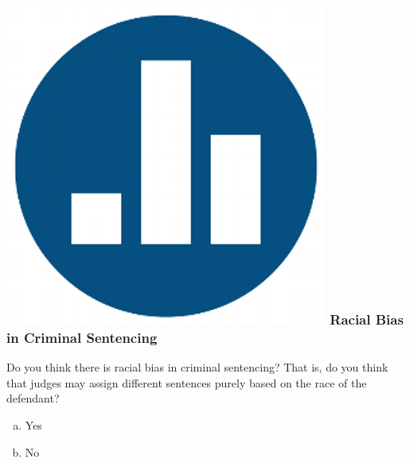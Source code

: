 \documentclass[handout]{beamer}
\begin{document}
%
%

\begin{frame}

\frametitle{\includegraphics[scale = 0.05]{./images/clicker} \hfill  Racial Bias in Criminal Sentencing}

Do you think there is racial bias in criminal sentencing? That is, do you think that judges may assign different sentences purely based on the race of the defendant?

\begin{enumerate}[(a)]
	\item Yes
	\item No
\end{enumerate}

\end{frame}
\end{document}
